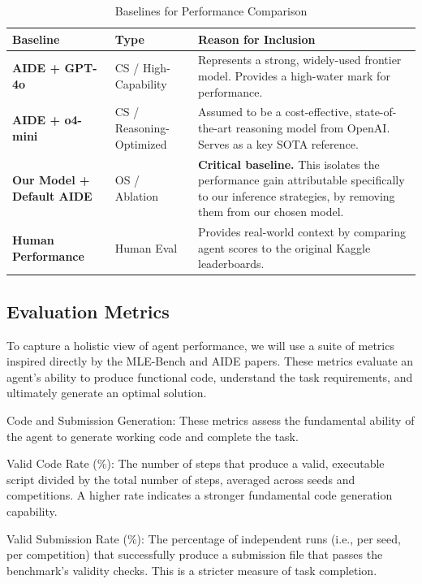 \begin{table}[htbp]
\centering
\caption{Baselines for Performance Comparison}
\label{baselines}
\begin{tabular}{p{4cm} l p{6.5cm}}
\toprule
\textbf{Baseline} & \textbf{Type} & \textbf{Reason for Inclusion} \\
\midrule
\textbf{AIDE + GPT-4o} & CS / High-Capability & Represents a strong, widely-used frontier model. Provides a high-water mark for performance. \\
\textbf{AIDE + o4-mini} & CS / Reasoning-Optimized & Assumed to be a cost-effective, state-of-the-art reasoning model from OpenAI. Serves as a key SOTA reference. \\
\textbf{Our Model + Default AIDE} & OS / Ablation & \textbf{Critical baseline.} This isolates the performance gain attributable specifically to our inference strategies, by removing them from our chosen model. \\
\textbf{Human Performance} & Human Eval & Provides real-world context by comparing agent scores to the original Kaggle leaderboards. \\
\bottomrule
\end{tabular}
\end{table}

\subsection{Evaluation Metrics}

To capture a holistic view of agent performance, we will use a suite of metrics inspired directly by the MLE-Bench and AIDE papers. These metrics evaluate an agent's ability to produce functional code, understand the task requirements, and ultimately generate an optimal solution.

Code and Submission Generation: These metrics assess the fundamental ability of the agent to generate working code and complete the task.

Valid Code Rate (\%): The number of steps that produce a valid, executable script divided by the total number of steps, averaged across seeds and competitions. A higher rate indicates a stronger fundamental code generation capability.

Valid Submission Rate (\%): The percentage of independent runs (i.e., per seed, per competition) that successfully produce a submission file that passes the benchmark's validity checks. This is a stricter measure of task completion.

